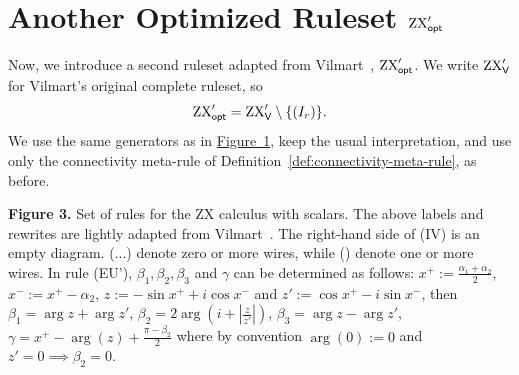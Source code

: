 \section{Another Optimized Ruleset \texorpdfstring{\(\textup{ZX}_{\textsf{opt}}'\)}{ZX\_opt'}}
\label{sec:another-optimized-ruleset}

Now, we introduce a second ruleset adapted from Vilmart~\cite{8785765}, \(\textup{ZX}_{\textsf{opt}}'\). We write \(\textup{ZX}_{\textsf{V}}'\) for Vilmart's original complete ruleset, so
\[
\textup{ZX}_{\textsf{opt}}'=\textup{ZX}_{\textsf{V}}'\setminus\{(I_r)\}.
\]
We use the same generators as in \hyperlink{tab:zx-generators}{Figure~1}, keep the usual interpretation, and use only the connectivity meta-rule of Definition~\ref{def:connectivity-meta-rule}, as before.

\begin{center}
\begingroup
\setlength{\tabcolsep}{4pt}
\renewcommand{\arraystretch}{1.25}

\vspace{0.5em}

\begin{minipage}{\textwidth}
\small
\textbf{Figure 3.} Set of rules \zxoptprime for the ZX calculus with scalars. The above labels and rewrites are lightly adapted from Vilmart~\cite{8785765}. The right-hand side of (IV) is an empty diagram. (...) denote zero or more wires, while () denote one or more wires. In rule (EU'), $\beta_1,\beta_2,\beta_3$ and $\gamma$ can be determined as follows: $x^+:=\frac{\alpha_1+\alpha_2}{2}$, $x^-:=x^+-\alpha_2$, $z := -\sin{x^+}+i\cos{x^-}$ and $z' := \cos{x^+}-i\sin{x^-}$, then $\beta_1 = \arg z + \arg z'$, $\beta_2 = 2\arg\left(i+\left|\frac{z}{z'}\right|\right)$, $\beta_3 = \arg z - \arg z'$, $\gamma = x^+-\arg(z)+\frac{\pi-\beta_2}{2}$ where by convention $\arg(0):=0$ and $z'=0\implies \beta_2=0$.
\end{minipage}
\endgroup
\end{center}

